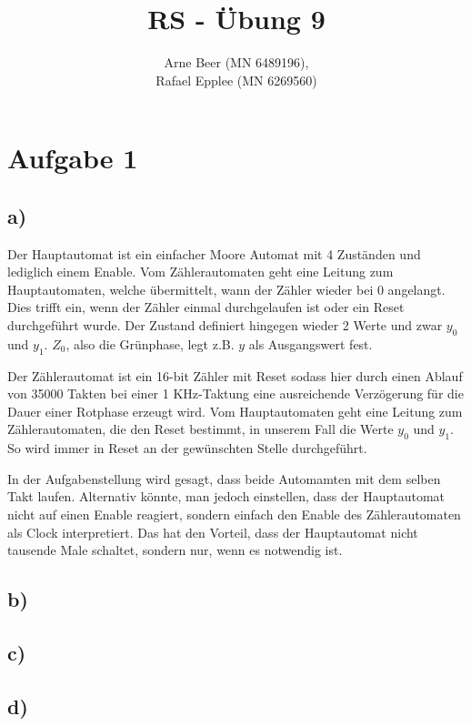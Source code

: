 \documentclass{article}
\title{RS - Übung 9}
\author{Arne Beer (MN 6489196), \\
Rafael Epplee (MN 6269560)}
\begin{document}
\maketitle

\section*{Aufgabe 1}

	\subsection*{a)}
		
		Der Hauptautomat ist ein einfacher Moore Automat mit 4 Zuständen und lediglich einem Enable. Vom Zählerautomaten geht eine Leitung zum Hauptautomaten, welche übermittelt, wann der Zähler wieder bei 0 angelangt. Dies trifft ein, wenn der Zähler einmal durchgelaufen ist oder ein Reset durchgeführt wurde. Der Zustand definiert hingegen wieder 2 Werte und zwar $y_0$ und $y_1$. $Z_0$, also die Grünphase, legt z.B. $y$ als Ausgangswert fest. 

		Der Zählerautomat ist ein 16-bit Zähler mit Reset sodass hier durch einen Ablauf von 35000 Takten bei einer 1 KHz-Taktung eine ausreichende Verzögerung für die Dauer einer Rotphase erzeugt wird. Vom Hauptautomaten geht eine Leitung zum Zählerautomaten, die den Reset bestimmt, in unserem Fall die Werte $y_0$ und $y_1$. So wird immer in Reset an der gewünschten Stelle durchgeführt.

		In der Aufgabenstellung wird gesagt, dass beide Automamten mit dem selben Takt laufen. Alternativ könnte, man jedoch einstellen, dass der Hauptautomat nicht auf einen Enable reagiert, sondern einfach den Enable des Zählerautomaten als Clock interpretiert. Das hat den Vorteil, dass der Hauptautomat nicht tausende Male schaltet, sondern nur, wenn es notwendig ist. 
		
		

	\subsection*{b)}



	\subsection*{c)}



	\subsection*{d)}
\end{document}
